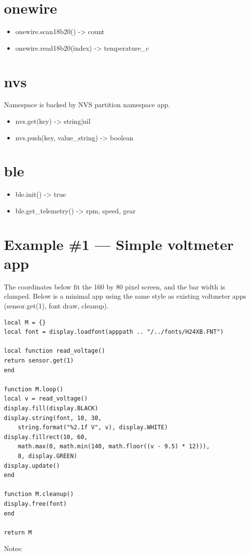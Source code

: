 \section{onewire}
\begin{itemize}
\item onewire.scan18b20() -> count
\item onewire.read18b20(index) -> temperature\_c
\end{itemize}
\section{nvs}
Namespace is backed by NVS partition namespace app.

\begin{itemize}
\item nvs.get(key) -> string|nil
\item nvs.push(key, value\_string) -> boolean
\end{itemize}
\section{ble}
\begin{itemize}
\item ble.init() -> true
\item ble.get\_telemetry() -> rpm, speed, gear
\end{itemize}
\section{Example \#1 — Simple voltmeter app}
The coordinates below fit the 160 by 80 pixel screen, and the bar width is clamped.
Below is a minimal app using the same style as existing voltmeter apps (sensor.get(1), font draw, cleanup).

\begin{verbatim}
local M = {}
local font = display.loadfont(apppath .. "/../fonts/H24XB.FNT")

local function read_voltage()
return sensor.get(1)
end

function M.loop()
local v = read_voltage()
display.fill(display.BLACK)
display.string(font, 10, 30,
    string.format("%2.1f V", v), display.WHITE)
display.fillrect(10, 60,
    math.max(0, math.min(140, math.floor((v - 9.5) * 12))),
    8, display.GREEN)
display.update()
end

function M.cleanup()
display.free(font)
end

return M
\end{verbatim}
Notes:

